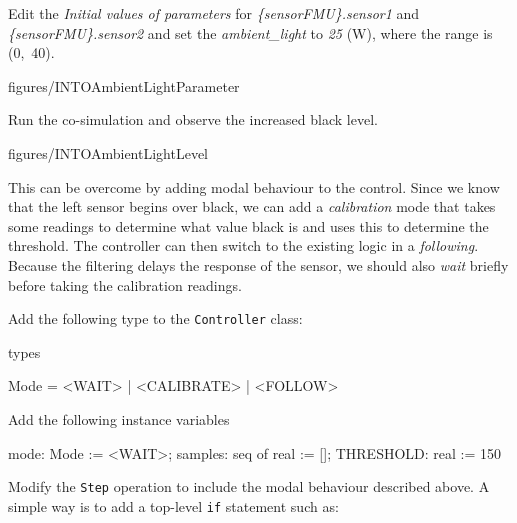\documentclass[11pt,a4paper]{../tutorial}
\begin{document}
\begin{instructions}
\item  Edit the \emph{Initial values of parameters} for \emph{\{sensorFMU\}.sensor1} and \emph{\{sensorFMU\}.sensor2} and set the \emph{ambient\_light} to \emph{25} (W), where the range is (0,~40).

    \begin{annotation}[width=0.85\linewidth,trim=0 100 0 400,clip]{figures/INTOAmbientLightParameter}
    \end{annotation}

\item Run the co-simulation and observe the increased black level.

    \begin{annotation}[width=0.85\linewidth,trim=0 250 0 200,clip]{figures/INTOAmbientLightLevel}
    \end{annotation}

\item This can be overcome by adding modal behaviour to the control. Since we know that the left sensor begins over black, we can add a \emph{calibration} mode that takes some readings to determine what value black is and uses this to determine the threshold. The controller can then switch to the existing logic in a \emph{following}. Because the filtering delays the response of the sensor, we should also \emph{wait} briefly before taking the calibration readings.

\item Add the following type to the \texttt{Controller} class:

    \bigskip
    \begin{vdm}[style=styleVDM,basicstyle=\ttfamily\scriptsize,xleftmargin=0em]
    types

    Mode = <WAIT> | <CALIBRATE> | <FOLLOW>
    \end{vdm}

\item Add the following instance variables

    \bigskip
    \begin{vdm}[style=styleVDM,basicstyle=\ttfamily\scriptsize,xleftmargin=0em]
    mode: Mode := <WAIT>;
    samples: seq of real := [];
    THRESHOLD: real := 150
    \end{vdm}

\item Modify the \texttt{Step} operation to include the modal behaviour described above. A simple way is to add a top-level \texttt{if} statement such as:


\end{instructions}
\end{document}
